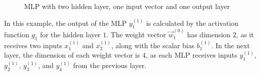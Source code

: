 \begin{figure}[h]
{
}
\caption{\gls{MLP} with two hidden layer, one input vector and one output layer}
\end{figure}


In this example, the output of the \gls{MLP} $y^{(1)}_1$ is calculated by the activation function $g_1$ for the hidden layer $1$. The weight vector $\vec{w}^{(0)}_1$ has dimension $2$, as it receives two inputs $x^{(1)}_1$ and $x^{(1)}_2$, along with the scalar bias $b^{(1)}_1$. In the next layer, the dimension of each weight vector is $4$, as each \gls{MLP} receives inputs $y^{(1)}_1$, $y^{(1)}_2$, $y^{(1)}_3$, and $y^{(1)}_4$ from the previous layer.

